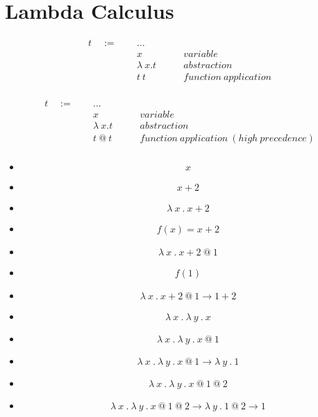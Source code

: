 
\section{Lambda Calculus}

\begin{frame}
\begin{displaymath}
    \begin{aligned}
t \quad:=\quad& ~ \ldots &\\
  & ~ x \quad\quad &variable\\
  & ~ \lambda~x . t \quad\quad &abstraction\\
  & ~ t ~ t \quad\quad &function~application\\
    \end{aligned}
  \end{displaymath}
\end{frame}

\begin{frame}
\begin{displaymath}
    \begin{aligned}
t \quad:=\quad& ~ \ldots &\\
  & ~ x \quad\quad &variable\\
  & ~ \lambda~x . t \quad\quad &abstraction\\
  & ~ t~@~t \quad\quad &function~application~(high~precedence)\\
    \end{aligned}
  \end{displaymath}
\end{frame}

\begin{frame}
  \begin{itemize}
\item \[ x \] 
\item \[ x + 2 \]
\item \[ \lambda~x~.~x + 2 \]
\item \[f(x) = x + 2\]
\item \[ \lambda~x~.~x + 2~ @ ~1 \]
\item \[f(1)\]
\item \[ \lambda~x~.~x + 2~ @ ~1 \longrightarrow 1 + 2 \]
  \end{itemize}
\end{frame}

\begin{frame}
  \begin{itemize}
\item \[ \lambda~x~.~\lambda~y~.~x \]
\item \[ \lambda~x~.~\lambda~y~.~x~@~1 \]
\item \[ \lambda~x~.~\lambda~y~.~x~@~1 \longrightarrow \lambda~y~.~1 \]
\item \[ \lambda~x~.~\lambda~y~.~x~@~1~@~2 \] 
\item \[ \lambda~x~.~\lambda~y~.~x~@~1~@~2 \longrightarrow \lambda~y~.~1~@~2 \longrightarrow 1 \]
  \end{itemize}
\end{frame}

